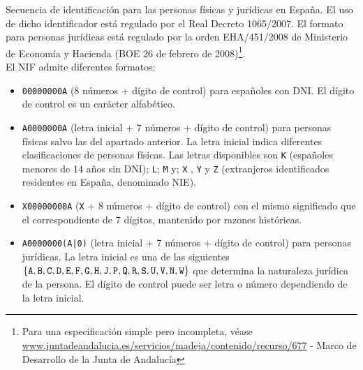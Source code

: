 %
%

	Secuencia de identificación para las personas físicas y jurídicas en España. El uso de dicho identificador está regulado por el Real Decreto 1065/2007. El formato para personas jurídicas está regulado por la orden EHA/451/2008 de Ministerio de Economía y Hacienda (BOE 26 de febrero de 2008)\footnote{Para una especificación simple pero incompleta, véase \url{www.juntadeandalucia.es/servicios/madeja/contenido/recurso/677} - Marco de Desarrollo de la Junta de Andalucía}.\\

	El NIF admite diferentes formatos:

\begin{itemize}
	\item \verb|00000000A| (8 números + dígito de control) para españoles con \gls{DNI}. El dígito de control es un carácter alfabético.
	\item \verb|A0000000A| (letra inicial + 7 números + dígito de control) para personas físicas salvo las del apartado anterior. La letra inicial indica diferentes clasificaciones de personas físicas. Las letras disponibles son \verb|K| (españoles menores de 14 años sin DNI); \verb|L|; \verb|M| y; \verb|X| , \verb|Y| y \verb|Z| (extranjeros identificados residentes en España, denominado \gls{NIE}).
	\item \verb|X00000000A| (\verb|X| + 8 números + dígito de control) con el mismo significado que el correspondiente de 7 dígitos, mantenido por razones históricas. 
	\item \verb:A0000000(A|0): (letra inicial + 7 números + dígito de control) para personas jurídicas. La letra inicial es una de las siguientes $\{ \verb|A|, \verb|B|, \verb|C|, \verb|D|, \verb|E|, \verb|F|, \verb|G|, \verb|H|, \verb|J|, \verb|P|, \verb|Q|, \verb|R|, \verb|S|, \verb|U|, \verb|V|, \verb|N|, \verb|W| \}$ que determina la naturaleza jurídica de la persona. El dígito de control puede ser letra o número dependiendo de la letra inicial.\\
 \end{itemize}

